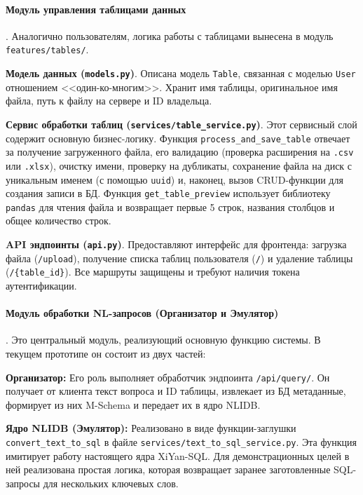 \paragraph{Модуль управления таблицами данных}.
Аналогично пользователям, логика работы с таблицами вынесена в модуль \verb|features/tables/|.
\begin{compactenum}
      \item \textbf{Модель данных (\texttt{models.py})}. Описана модель \verb|Table|,
      связанная с моделью \verb|User| отношением <<один-ко-многим>>. Хранит имя таблицы,
      оригинальное имя файла, путь к файлу на сервере и ID владельца.
      \item \textbf{Сервис обработки таблиц (\texttt{services/table\_service.py})}. Этот
      сервисный слой содержит основную бизнес-логику. Функция \verb|process_and_save_table|
      отвечает за получение загруженного файла, его валидацию
      (проверка расширения на \verb|.csv| или \verb|.xlsx|), очистку имени, проверку на
      дубликаты, сохранение файла на диск с уникальным именем (с помощью \verb|uuid|) и,
      наконец, вызов CRUD-функции для создания записи в БД. Функция \verb|get_table_preview|
      использует библиотеку \verb|pandas| для чтения файла и возвращает первые 5 строк,
      названия столбцов и общее количество строк.
      \item \textbf{API эндпоинты (\texttt{api.py})}. Предоставляют интерфейс для фронтенда:
      загрузка файла (\verb|/upload|), получение списка таблиц пользователя (\verb|/|) и
      удаление таблицы (\verb|/{table_id}|). Все маршруты защищены и требуют наличия токена
      аутентификации.
\end{compactenum}

\paragraph{Модуль обработки NL-запросов (Организатор и Эмулятор)}.
Это центральный модуль, реализующий основную функцию системы. В текущем прототипе он
состоит из двух частей:
\begin{compactenum}
      \item \textbf{Организатор:} Его роль выполняет обработчик эндпоинта
      \verb|/api/query/|. Он получает от клиента текст вопроса и ID таблицы,
      извлекает из БД метаданные, формирует из них M-Schema и передает их в ядро NLIDB.
      \item \textbf{Ядро NLIDB (Эмулятор):} Реализовано в виде функции-заглушки
      \verb|convert_text_to_sql| в файле \verb|services/text_to_sql_service.py|.
      Эта функция имитирует работу настоящего ядра XiYan-SQL. Для демонстрационных целей в
      ней реализована простая логика, которая возвращает заранее заготовленные SQL-запросы
      для нескольких ключевых слов.
\end{compactenum}

